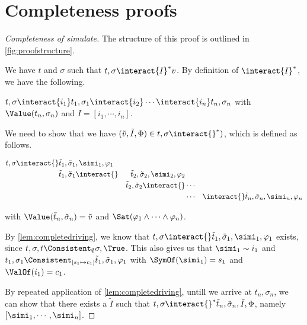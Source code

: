 
\section{Completeness proofs}
\label{sec:completenessproofs}

\begin{proof}[Completeness of simulate]
  The structure of this proof is outlined in \cref{fig:proofstructure}.

  We have $t$ and $\sigma$ such that $t,\sigma\interact{I}^*v$.
  By definition of $\interact{I}^*$, we have the following.

  $t,\sigma\interact{i_1}t_1,\sigma_1\interact{i_2}\cdots \interact{i_n}t_n,\sigma_n$ with $\Value(t_n,\sigma_n)$ and $I=[i_1,\cdots,i_n]$.

  We need to show that we have $(\tilde{v},\tilde{I},\Phi)\in t,\sigma\interact{}^*)$,
  which is defined as follows.

  \begin{align*}
      t,\sigma\interact{}&\tilde{t}_1,\tilde{\sigma}_1,\simi_1,\phi_1&\\
                      &\tilde{t}_1,\tilde{\sigma}_1\interact{}&\tilde{t}_2,\tilde{\sigma}_2,\simi_2,\phi_2\\
                      &                                    &\tilde{t}_2,\tilde{\sigma}_2\interact{}&\cdots&\\
                      &                                    &                                    &\cdots&
                      \interact{}\tilde{t}_n,\tilde{\sigma}_n,\simi_n,\phi_n
  \end{align*}

  with $\Value(\tilde{t}_n,\tilde{\sigma}_n)=\tilde{v}$ and $\Sat(\phi_1\land\cdots\land\phi_n)$.

  By \cref{lem:completedriving}, we know that $t,\sigma\interact{}\tilde{t}_1,\tilde{\sigma}_1,\simi_1,\phi_1$ exists,
  since $t,\sigma,t\Consistent_{\emptyset}\sigma,\True$.
  This also gives us that $\simi_1\sim i_1$ and $t_1,\sigma_1\Consistent_{[s_1\mapsto c_1]}\tilde{t}_1,\tilde{\sigma}_1,\phi_1$ with $\SymOf(\simi_1)=s_1$ and $\ValOf(i_1)=c_1$.

  By repeated application of \cref{lem:completedriving}, untill we arrive at $t_n,\sigma_n$,
  we can show that there exists a $\tilde{I}$ such that $t,\sigma\interact{}^*\tilde{t}_n,\tilde{\sigma}_n,\tilde{I},\Phi$,
  namely $[\simi_1,\cdots,\simi_n]$.

\end{proof}

